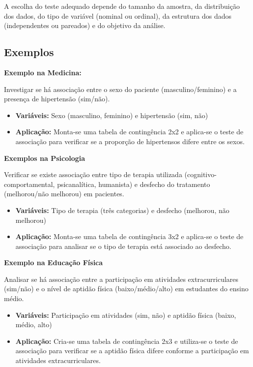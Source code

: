 \documentclass[
]{book}
\begin{document}
A escolha do teste adequado depende do tamanho da amostra, da distribuição dos dados, do tipo de variável (nominal ou ordinal), da estrutura dos dados (independentes ou pareados) e do objetivo da análise.

\subsection{Exemplos}\label{exemplos}

\textbf{Exemplo na Medicina:}

Investigar se há associação entre o sexo do paciente (masculino/feminino) e a presença de hipertensão (sim/não).

\begin{itemize}
\item
  \textbf{Variáveis:} Sexo (masculino, feminino) e hipertensão (sim, não)
\item
  \textbf{Aplicação:} Monta-se uma tabela de contingência 2x2 e aplica-se o teste de associação para verificar se a proporção de hipertensos difere entre os sexos.
\end{itemize}

\textbf{Exemplos na Psicologia}

Verificar se existe associação entre tipo de terapia utilizada (cognitivo-comportamental, psicanalítica, humanista) e desfecho do tratamento (melhorou/não melhorou) em pacientes.

\begin{itemize}
\item
  \textbf{Variáveis:} Tipo de terapia (três categorias) e desfecho (melhorou, não melhorou)
\item
  \textbf{Aplicação:} Monta-se uma tabela de contingência 3x2 e aplica-se o teste de associação para analisar se o tipo de terapia está associado ao desfecho.
\end{itemize}

\textbf{Exemplo na Educação Física}

Analisar se há associação entre a participação em atividades extracurriculares (sim/não) e o nível de aptidão física (baixo/médio/alto) em estudantes do ensino médio.

\begin{itemize}
\item
  \textbf{Variáveis:} Participação em atividades (sim, não) e aptidão física (baixo, médio, alto)
\item
  \textbf{Aplicação:} Cria-se uma tabela de contingência 2x3 e utiliza-se o teste de associação para verificar se a aptidão física difere conforme a participação em atividades extracurriculares.
\end{itemize}
\end{document}
